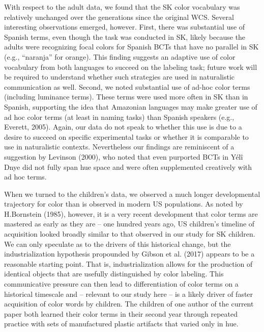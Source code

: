 \documentclass[
  english,
  ,man,floatsintext]{apa6}
\begin{document}
With respect to the adult data, we found that the SK color vocabulary was relatively unchanged over the generations since the original WCS. Several interesting observations emerged, however. First, there was substantial use of Spanish terms, even though the task was conducted in SK, likely because the adults were recognizing focal colors for Spanish BCTs that have no parallel in SK (e.g., \enquote{naranja} for orange). This finding suggests an adaptive use of color vocabulary from both languages to succeed on the labeling task; future work will be required to understand whether such strategies are used in naturalistic communication as well. Second, we noted substantial use of ad-hoc color terms (including luminance terms). These terms were used more often in SK than in Spanish, supporting the idea that Amazonian languages may make greater use of ad hoc color terms (at least in naming tasks) than Spanish speakers (e.g., Everett, 2005). Again, our data do not speak to whether this use is due to a desire to succeed on specific experimental tasks or whether it is comparable to use in naturalistic contexts. Nevertheless our findings are reminiscent of a suggestion by Levinson (2000), who noted that even purported BCTs in Yélî Dnye did not fully span hue space and were often supplemented creatively with ad hoc terms.

When we turned to the children's data, we observed a much longer developmental trajectory for color than is observed in modern US populations. As noted by H.Bornstein (1985), however, it is a very recent development that color terms are mastered as early as they are -- one hundred years ago, US children's timeline of acquisition looked broadly similar to that observed in our study for SK children. We can only speculate as to the drivers of this historical change, but the industrialization hypothesis propounded by Gibson et al. (2017) appears to be a reasonable starting point. That is, industrialization allows for the production of identical objects that are usefully distinguished by color labeling. This communicative pressure can then lead to differentiation of color terms on a historical timescale and -- relevant to our study here -- is a likely driver of faster acquisition of color words by children. The children of one author of the current paper both learned their color terms in their second year through repeated practice with sets of manufactured plastic artifacts that varied only in hue.
\end{document}
